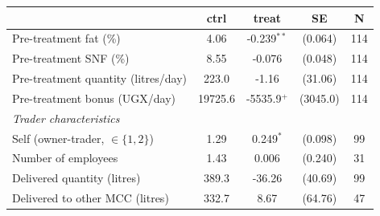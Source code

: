 \begin{tabular}{lcccc}
\hline\hline
 & ctrl & treat & SE & N \\
\hline
Pre-treatment fat (\%) & 4.06 & -0.239$^{**}$ & (0.064) & 114 \\
Pre-treatment SNF (\%) & 8.55 & -0.076 & (0.048) & 114 \\
Pre-treatment quantity (litres/day) & 223.0 & -1.16 & (31.06) & 114 \\
Pre-treatment bonus (UGX/day) & 19725.6 & -5535.9$^{+}$ & (3045.0) & 114 \\
\hline
\multicolumn{5}{l}{\textit{Trader characteristics}} \\
Self (owner-trader, $\in\{1,2\}$) & 1.29 & 0.249$^{*}$ & (0.098) & 99 \\
Number of employees & 1.43 & 0.006 & (0.240) & 31 \\
Delivered quantity (litres) & 389.3 & -36.26 & (40.69) & 99 \\
Delivered to other MCC (litres) & 332.7 & 8.67 & (64.76) & 47 \\
\hline\hline
\end{tabular}
